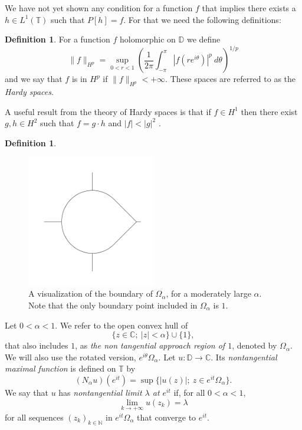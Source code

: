 \documentclass[a4paper,12pt,twoside,BCOR=10mm]{scrbook}
\theoremstyle{definition}
\theoremstyle{definition}
\theoremstyle{definition}
\newtheorem{definition}[theorem]{Definition}
\begin{document}
We have not yet shown any condition for a function $f$ that implies there exists a $h \in L^1(\mathbb{T})$ such that $P[h] = f$.
For that we need the following definitions:
\begin{definition}
\label{index24}
For a function $f$ holomorphic on $\mathbb{D}$ we define
\[
	\|f\|_{H^p} = 
	\sup_{0 < r < 1} \left ( \frac{1}{2\pi}\int_{-\pi}^{\pi} |f(re^{i\theta})|^p\ d\theta \right )^{1/p}
\]
and we say that $f$ is in $H^p$ if $\|f\|_{H^p} < +\infty$.
These spaces are referred to as the \emph{Hardy spaces}.
\end{definition}
A useful result from the theory of Hardy spaces is that if $f \in H^1$ then there exist $g, h \in H^2$ such that $f = g \cdot h$ and $|f| < |g|^2$ \citep[Theorem $17.10$]{rudin2}.
\begin{definition}
\label{index25}
\begin{figure}[h]
\centering
\includegraphics[width=0.5\textwidth]{approach-region-7-boundary}
\caption{A visualization of the boundary of $\Omega_{\alpha}$, for a moderately large $\alpha$. Note that the only boundary point included in $\Omega_{\alpha}$ is $1$. }
\end{figure}
Let $0 < \alpha < 1$.
We refer to the open convex hull of
\[
	\{z \in \mathbb{C};\ |z| < \alpha\} \cup \{1\},
\]
that also includes $1$, as \emph{the non tangential approach region of $1$}, denoted by $\Omega_{\alpha}$.
We will also use the rotated version, $e^{i\theta}\Omega_{\alpha}$.
Let $u: \mathbb{D} \rightarrow \mathbb{C}$.
Its \emph{nontangential maximal function} is defined on $\mathbb{T}$ by
\[
	(N_{\alpha}u)(e^{it}) = \sup \{|u(z)|;\ z \in e^{it}\Omega_{\alpha}\}.
\]
We say that $u$ has \emph{nontangential limit $\lambda$ at $e^{it}$} if, for all $0 < \alpha < 1$,
\[
	\lim_{k \rightarrow +\infty} u(z_k) = \lambda
\]
for all sequences $(z_k)_{k \in \mathbb{N}}$ in $e^{it}\Omega_{\alpha}$ that converge to $e^{it}$.
\end{definition}
\end{document}
